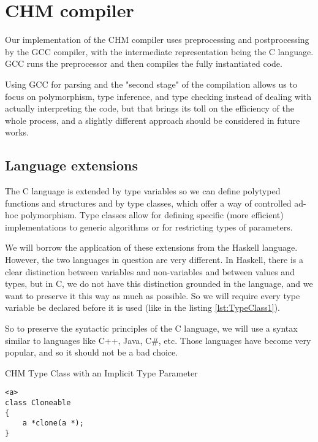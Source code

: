 \chapter{CHM compiler}
\label{chap:compilerCHM}

Our implementation of the CHM compiler uses preprocessing and postprocessing by the GCC compiler, with the intermediate representation being the C language. GCC runs the preprocessor and then compiles the fully instantiated code.

Using GCC for parsing and the "second stage" of the compilation allows us to focus on polymorphism, type inference, and type checking instead of dealing with actually interpreting the code, but that brings its toll on the efficiency of the whole process, and a slightly different approach should be considered in future works.

\section{Language extensions}

The C language is extended by type variables so we can define polytyped functions and structures and by type classes, which offer a way of controlled ad-hoc polymorphism. Type classes allow for defining specific (more efficient) implementations to generic algorithms or for restricting types of parameters.

We will borrow the application of these extensions from the Haskell language. However, the two languages in question are very different. In Haskell, there is a clear distinction between variables and non-variables and between values and types, but in C, we do not have this distinction grounded in the language, and we want to preserve it this way as much as possible. So we will require every type variable be declared before it is used (like in the listing \ref{lst:TypeClass1}).

So to preserve the syntactic principles of the C language, we will use a syntax similar to languages like C++, Java, C\#, etc. Those languages have become very popular, and so it should not be a bad choice.

\begin{listing}
\caption{CHM Type Class with an Implicit Type Parameter}
\label{lst:TypeClass1}
\begin{lstlisting}
<a>
class Cloneable
{
    a *clone(a *);
}
\end{lstlisting}
\end{listing}

